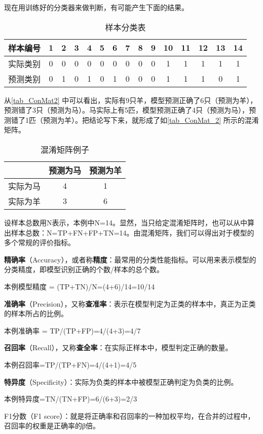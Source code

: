 现在用训练好的分类器来做判断，有可能产生下面的结果。

\begin{table}[ht]
\centering
\caption{样本分类表}\label{tab_ConMat2}
\begin{tabular}{|c|c|c|c|c|c|c|c|c|c|c|c|c|c|c|}
\hline
样本编号 & 1 & 2 & 3 & 4 & 5 & 6 & 7 & 8 & 9 & 10 & 11 & 12 & 13 & 14 \\
\hline
实际类别 & 0 & 0 & 0 & 0 & 0 & 0 & 0 & 0 & 0 & 1 & 1 & 1 & 1 & 1 \\
\hline
预测类别 & 0 & 1 & 0 & 1 & 0 & 1 & 0 & 0 & 0 & 1 & 1 & 1 & 0 & 1 \\
\hline
\end{tabular}
\end{table}

从\autoref{tab_ConMat2} 中可以看出，实际有9只羊，模型预测正确了6只（预测为羊），预测错了3只（预测为马）。马实际上有5匹，模型预测正确了4只（预测为马），预测错了1匹（预测为羊）。把结论写下来，就形成了如\autoref{tab_ConMat_2} 所示的混淆矩阵。
\begin{table}[ht]
\centering
\caption{混淆矩阵例子}\label{tab_ConMat_2}
\begin{tabular}{|c|c|c|}
\hline
 & 预测为马 & 预测为羊 \\
\hline
实际为马 & 4 & 1 \\
\hline
实际为羊 & 3 & 6 \\
\hline
\end{tabular}
\end{table}

设样本总数用N表示，本例中N=14。显然，当只给定混淆矩阵时，也可以从中算出样本总数：N=TP+FN+FP+TN=14。由混淆矩阵，我们可以得出对于模型的多个常规的评价指标。

\textbf{精确率}（Accuracy），或者称\textbf{精度}：最常用的分类性能指标。可以用来表示模型的分类精度，即模型识别正确的个数/样本的总个数。

本例模型精度 = (TP+TN)/N=(4+6)/14=10/14

\textbf{准确率}（Precision），又称\textbf{查准率}：表示在模型判定为正类的样本中，真正为正类的样本所占的比例。

本例准确率 = TP/(TP+FP)=4/(4+3)=4/7

\textbf{召回率}（Recall），又称\textbf{查全率}：在实际正样本中，模型判定正确的数量。

本例召回率=TP/(TP+FN)=4/(4+1)=4/5

\textbf{特异度}（Specificity）：实际为负类的样本中被模型正确判定为负类的比例。

本例特异度=TN/(TN+FP)=6/(6+3)=2/3

F1分数（F1 score）：就是将正确率和召回率的一种加权平均，在合并的过程中，召回率的权重是正确率的β倍。
